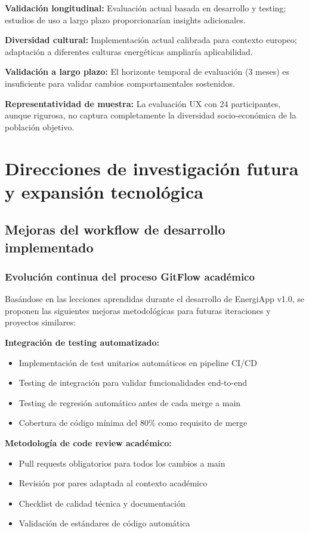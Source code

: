 \textbf{Validación longitudinal:} Evaluación actual basada en desarrollo y testing; estudios de uso a largo plazo proporcionarían insights adicionales.

\textbf{Diversidad cultural:} Implementación actual calibrada para contexto europeo; adaptación a diferentes culturas energéticas ampliaría aplicabilidad.

\textbf{Validación a largo plazo:} El horizonte temporal de evaluación (3 meses) es insuficiente para validar cambios comportamentales sostenidos.

\textbf{Representatividad de muestra:} La evaluación UX con 24 participantes, aunque rigurosa, no captura completamente la diversidad socio-económica de la población objetivo.

\section{Direcciones de investigación futura y expansión tecnológica}

\subsection{Mejoras del workflow de desarrollo implementado}

\subsubsection{Evolución continua del proceso GitFlow académico}

Basándose en las lecciones aprendidas durante el desarrollo de EnergiApp v1.0, se proponen las siguientes mejoras metodológicas para futuras iteraciones y proyectos similares:

\textbf{Integración de testing automatizado:}
\begin{itemize}
    \item Implementación de test unitarios automáticos en pipeline CI/CD
    \item Testing de integración para validar funcionalidades end-to-end
    \item Testing de regresión automático antes de cada merge a main
    \item Cobertura de código mínima del 80\% como requisito de merge
\end{itemize}

\textbf{Metodología de code review académico:}
\begin{itemize}
    \item Pull requests obligatorios para todos los cambios a main
    \item Revisión por pares adaptada al contexto académico
    \item Checklist de calidad técnica y documentación
    \item Validación de estándares de código automática
\end{itemize}


